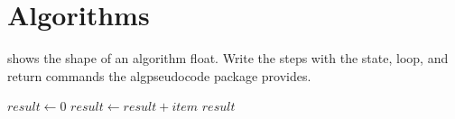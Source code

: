 \section{Algorithms}
 shows the shape of an algorithm float. Write the steps with the state, loop, and return commands the algpseudocode package provides.

\begin{algorithm}[htbp]
  \caption{A sample algorithm float.}
  \label{alg:sample}
  \begin{algorithmic}[1]
    \State $result \gets 0$
      \State $result \gets result + item$
    \EndFor
    \State \Return $result$
  \end{algorithmic}
\end{algorithm}
